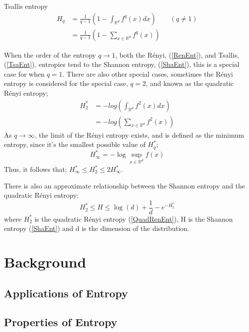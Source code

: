 \documentclass{report}
\begin{document}
Tsallis entropy
\begin{align} 
H_{q} &= \frac{1}{q-1} \left(1 - \int_{\mathbb{R}^d} f^q (x) dx \right)  \quad  \quad (q \neq 1) \label{TsaEnt} \\
&=  \frac{1}{q-1} \left(1 - \sum_{x \in \mathbb{R}^d} f^q (x) \right) \nonumber 
\end{align}

When the order of the entropy $q \to 1$, both the R\'enyi, (\ref{RenEnt}), and Tsallis, (\ref{TsaEnt}), entropies tend to the Shannon entropy, (\ref{ShaEnt}), this is a special case for when $q=1$. There are also other special cases, sometimes the R\'enyi entropy is considered for the special case, $q=2$, and known as the quadratic R\'enyi entropy;
\begin{align} 
H_{2}^{*} &= - log\left( \int_{\mathbb{R}^{d}} f^2(x) dx \right) \label{QuadRenEnt} \\
&= - log \left( \sum_{x \in \mathbb{R}^d} f^2 (x) \right) \nonumber 
\end{align}
As $q \to \infty$, the limit of the R\'enyi entropy exists, and is defined as the minimum entropy, since it's the smallest possible value of $H_{q}^{*}$;
\begin{equation}
H_{\infty}^{*} = - \log \sup_{x \in \mathbb{R}^d} f (x) \nonumber
\end{equation}
Thus, it follows that; $H_{\infty}^{*} \leq H_{2}^{*} \leq 2H_{\infty}^{*}$.

There is also an approximate relationship between the Shannon entropy and the quadratic R\'enyi entropy;
\begin{equation}
H_{2}^{*} \leq H \leq \log(d) + \frac{1}{d} - e^{-H_{2}^{*}} \nonumber
\end{equation}
where $H_{2}^{*}$ is the quadratic R\'enyi entropy (\ref{QuadRenEnt}), H is the Shannon entropy (\ref{ShaEnt}) and d is the dimension of the distribution.


\chapter{Background}

\section{Applications of Entropy}


\section{Properties of Entropy}
\end{document}
